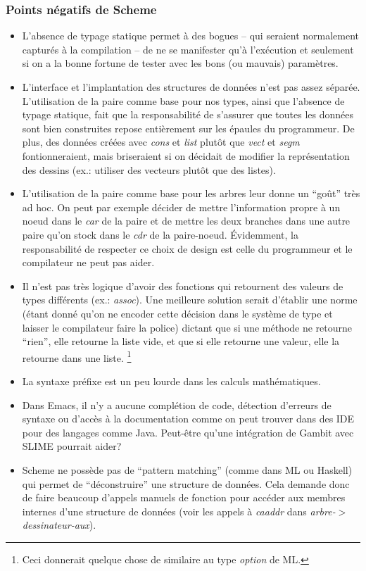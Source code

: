 \documentclass[10pt]{article}
\begin{document}
\subsubsection{Points négatifs de Scheme}
\begin{itemize}
\item L'absence de typage statique permet à des bogues -- qui seraient
  normalement capturés à la compilation -- de ne se manifester qu'à
  l'exécution et seulement si on a la bonne fortune de tester avec les
  bons (ou mauvais) paramètres.
\item L'interface et l'implantation des structures de données n'est
  pas assez séparée.  L'utilisation de la paire comme base pour nos
  types, ainsi que l'absence de typage statique, fait que la
  responsabilité de s'assurer que toutes les données sont bien
  construites repose entièrement sur les épaules du programmeur.  De
  plus, des données créées avec \emph{cons} et \emph{list} plutôt que
  \emph{vect} et \emph{segm} fontionneraient, mais briseraient si on
  décidait de modifier la représentation des dessins (ex.: utiliser
  des vecteurs plutôt que des listes).
\item L'utilisation de la paire comme base pour les arbres leur donne
  un ``goût'' très ad hoc.  On peut par exemple décider de mettre
  l'information propre à un noeud dans le \emph{car} de la paire et de
  mettre les deux branches dans une autre paire qu'on stock dans le
  \emph{cdr} de la paire-noeud.  Évidemment, la responsabilité de
  respecter ce choix de design est celle du programmeur et le
  compilateur ne peut pas aider.
\item Il n'est pas très logique d'avoir des fonctions qui retournent
  des valeurs de types différents (ex.: \emph{assoc}).  Une meilleure
  solution serait d'établir une norme (étant donné qu'on ne encoder
  cette décision dans le système de type et laisser le compilateur
  faire la police) dictant que si une méthode ne retourne ``rien'',
  elle retourne la liste vide, et que si elle retourne une valeur,
  elle la retourne dans une liste. \footnote{Ceci donnerait quelque
    chose de similaire au type \emph{option} de ML.}
\item La syntaxe préfixe est un peu lourde dans les calculs
  mathématiques.
\item Dans Emacs, il n'y a aucune complétion de code, détection
  d'erreurs de syntaxe ou d'accès à la documentation comme on peut
  trouver dans des IDE pour des langages comme Java.  Peut-être qu'une
  intégration de Gambit avec SLIME pourrait aider?
\item Scheme ne possède pas de ``pattern matching'' (comme dans ML ou
  Haskell) qui permet de ``déconstruire'' une structure de données.
  Cela demande donc de faire beaucoup d'appels manuels de fonction
  pour accéder aux membres internes d'une structure de données (voir
  les appels à \emph{caaddr} dans \emph{arbre-$>$dessinateur-aux}).
\end{itemize}
\end{document}
